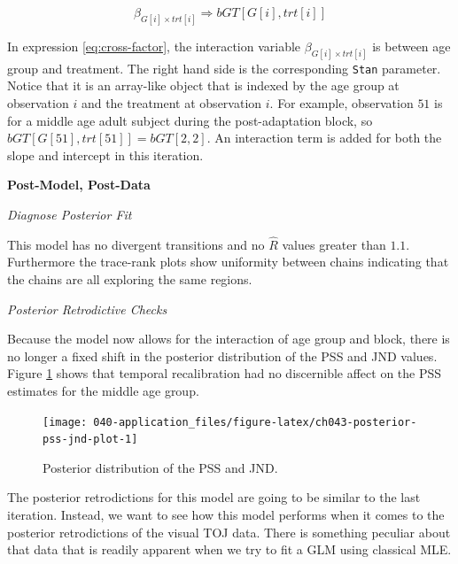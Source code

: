\documentclass[11pt, oneside, openany]{scrbook}
\begin{document}
\begin{equation}
\beta_{G[i] \times trt[i]} \Longrightarrow bGT[G[i], trt[i]]
\label{eq:cross-factor}
\end{equation}

In expression \eqref{eq:cross-factor}, the interaction variable \(\beta_{G[i] \times trt[i]}\) is between age group and treatment. The right hand side is the corresponding \texttt{Stan} parameter. Notice that it is an array-like object that is indexed by the age group at observation \(i\) and the treatment at observation \(i\). For example, observation \(51\) is for a middle age adult subject during the post-adaptation block, so \(bGT[G[51], trt[51]] = bGT[2, 2]\). An interaction term is added for both the slope and intercept in this iteration.

\textbf{Post-Model, Post-Data}

\emph{Diagnose Posterior Fit}

This model has no divergent transitions and no \(\hat{R}\) values greater than \(1.1\). Furthermore the trace-rank plots show uniformity between chains indicating that the chains are all exploring the same regions.

\emph{Posterior Retrodictive Checks}

Because the model now allows for the interaction of age group and block, there is no longer a fixed shift in the posterior distribution of the PSS and JND values. Figure \ref{fig:ch043-posterior-pss-jnd-plot} shows that temporal recalibration had no discernible affect on the PSS estimates for the middle age group.

\begin{figure}

{\centering \texttt{[image: 040-application\_files/figure-latex/ch043-posterior-pss-jnd-plot-1]} 

}

\caption{Posterior distribution of the PSS and JND.}\label{fig:ch043-posterior-pss-jnd-plot}
\end{figure}

The posterior retrodictions for this model are going to be similar to the last iteration. Instead, we want to see how this model performs when it comes to the posterior retrodictions of the visual TOJ data. There is something peculiar about that data that is readily apparent when we try to fit a GLM using classical MLE.

\end{document}
